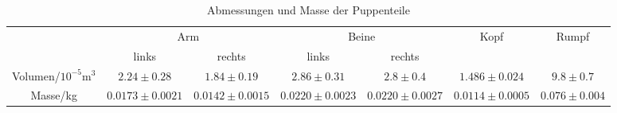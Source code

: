 \begin{table}[p]
	\centering
	\begin{tabular}{ccccccc}
	\toprule
	&\multicolumn{2}{c}{Arm} & \multicolumn{2}{c}{Beine}  & {Kopf} & {Rumpf}\\
	&{links} &{rechts} &{links} &{rechts} &{} & {}\\
	\midrule
	Volumen/$10^{-5}\si{\meter\cubed}$&$2.24 \pm0.28$ &$1.84 \pm0.19$&$2.86 \pm0.31 $&$2.8 \pm0.4 $&$1.486 \pm0.024$ &$9.8 \pm0.7$\\
	Masse/\si{\kilo\gram} &$0.0173 \pm0.0021$&$0.0142 \pm0.0015$&$0.0220 \pm0.0023$&$0.0220 \pm0.0027$&$0.0114 \pm0.0005$&$0.076 \pm0.004$\\
	\bottomrule
	\end{tabular}
	\caption{Abmessungen und Masse der Puppenteile}
	\label{tab:M6 Puppenteile}	
\end{table}